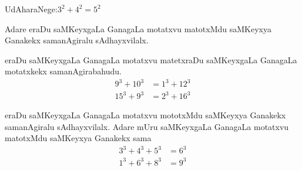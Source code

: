 UdAharaNege:\qquad $3^2+4^2 = 5^2$

Adare eraDu saMKeyxgaLa GanagaLa motatxvu matotxMdu saMKeyxya Ganakekx samanAgiralu sAdhayxvilalx.

eraDu saMKeyxgaLa GanagaLa motatxvu matetxraDu saMKeyxgaLa GanagaLa motatxkekx samanAgirabahudu.
\begin{align*}
9^3+10^3 &= 1^3+12^3\\
15^3+9^3 &= 2^3+ 16^3
\end{align*}

eraDu saMKeyxgaLa GanagaLa motatxvu mototxMdu saMKeyxya Ganakekx samanAgiralu sAdhayxvilalx. Adare mUru saMKeyxgaLa GanagaLa motatxvu matotxMdu saMKeyxya Ganakekx sama
\begin{align*}
3^3+4^3+5^3 &=6^3\\
1^3+6^3+8^3 &= 9^3
\end{align*}

